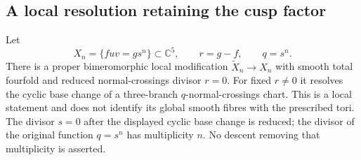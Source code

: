\subsection{A local resolution retaining the cusp factor}

\begin{proposition}
\label{push:B422}
Let
\[
 X_n=\{fuv=g s^n\}\subset\mathbb C^5,
 \qquad r=g-f,\qquad q=s^n.
\]
There is a proper bimeromorphic local modification
$\widetilde X_n\to X_n$ with smooth total fourfold
and reduced normal-crossings divisor $r=0$.
For fixed $r\ne0$ it resolves the cyclic base change
of a three-branch $q$-normal-crossings chart.
This is a local statement and does not identify its
global smooth fibres with the prescribed tori.
The divisor $s=0$ after the displayed cyclic base change
is reduced; the divisor of the original function $q=s^n$
has multiplicity $n$. No descent removing that multiplicity
is asserted.
\end{proposition}

